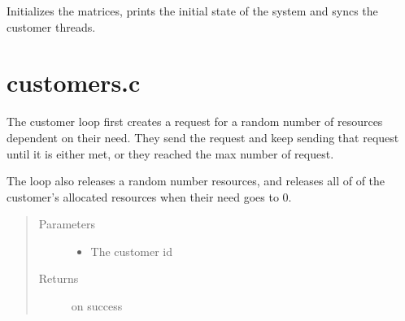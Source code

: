 \documentclass[letterpaper,10pt,english,openany,oneside]{sphinxmanual}
\begin{document}
\begin{fulllineitems}
Initializes the matrices, prints the initial state of the system and syncs
the customer threads.

\end{fulllineitems}



\section{customers.c}
\label{\detokenize{source_code:customers-c}}

\begin{fulllineitems}
\label{\detokenize{source_code:c.customer_loop}}%
\pysigstartmultiline
{}%
\pysigstopmultiline
The customer loop first creates a request for a random number of resources
dependent on their need. They send the request and keep sending that request
until it is either met, or they reached the max number of request.

The loop also releases a random number resources, and releases all of of the
customer’s allocated resources when their need goes to 0.
\begin{quote}\begin{description}
\item[{Parameters}] \leavevmode\begin{itemize}
\item {} 
 \textendash{} The customer id

\end{itemize}

\item[{Returns}]  on success

\end{description}\end{quote}

\end{fulllineitems}
\end{document}
